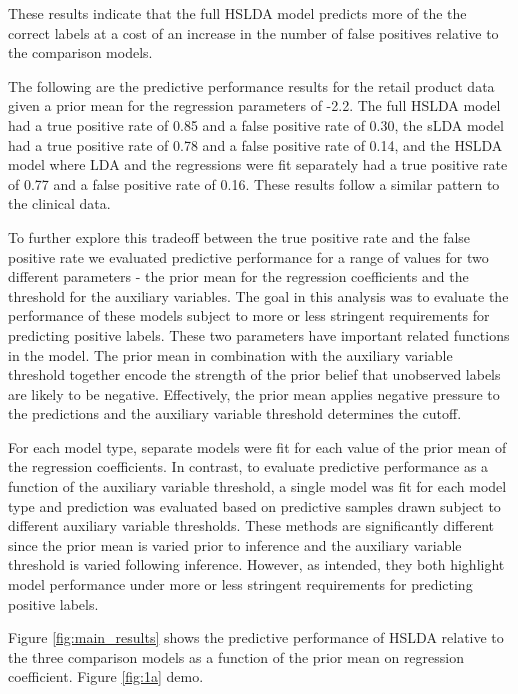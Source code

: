 These results indicate that the full HSLDA model predicts more of the the
correct labels at a cost of an increase in the number of false positives
relative to the comparison models.

The following are the predictive performance results for the retail product
data given a prior mean for the regression parameters of -2.2. 
The full HSLDA model had a true positive rate of 0.85 
and a false positive rate of 0.30, the sLDA model had a true positive
rate of 0.78 and a false positive rate of 0.14, and the HSLDA model where
LDA and the regressions were fit separately had a true positive rate of 0.77
and a false positive rate of 0.16. These results follow a similar pattern to the clinical data.

To further explore this tradeoff between the true positive rate and the
false positive rate we evaluated predictive performance for a range of values
for two different parameters - the prior mean for the regression coefficients
and the threshold for the auxiliary variables.  The goal in this analysis
was to evaluate the performance of these models subject to more or less
stringent requirements for predicting positive labels. These two parameters 
have important related functions in the model. The prior mean in combination 
with the auxiliary variable threshold together encode the strength of the prior
belief that unobserved labels are likely to be negative. Effectively, the
prior mean applies negative pressure to the predictions and the auxiliary
variable threshold determines the cutoff.

For each model type, separate models were fit for each value of the 
prior mean of the regression coefficients.  In contrast, to evaluate
predictive performance as a function of the auxiliary variable threshold,
a single model was fit for each model type and prediction was evaluated
based on predictive samples drawn subject to different auxiliary variable
thresholds. These methods are significantly different since the prior mean
is varied prior to inference and the auxiliary variable threshold is varied
following inference.  However, as intended, they both highlight model performance
under more or less stringent requirements for predicting positive labels.

Figure \ref{fig:main_results} shows the predictive performance of HSLDA 
relative to the three comparison models as a function of the prior mean
on regression coefficient. Figure \ref{fig:1a} demo.

